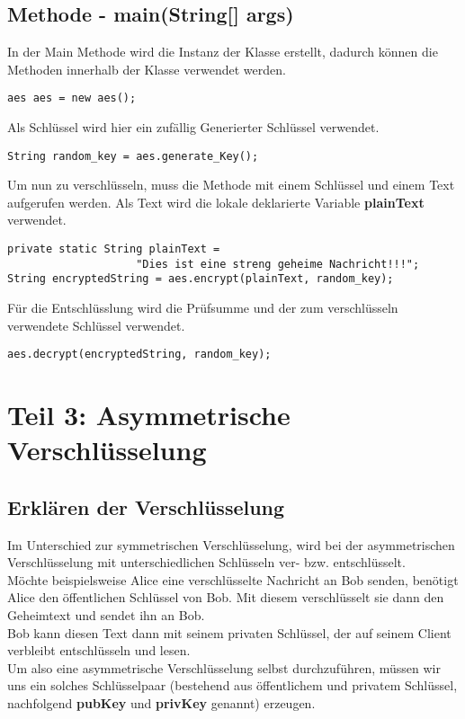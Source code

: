\documentclass[12pt]{article}
\begin{document}
\subsection{Methode - main(String[] args)}
In der Main Methode wird die Instanz der Klasse erstellt, dadurch können die Methoden innerhalb der Klasse verwendet werden.
\begin{lstlisting}
aes aes = new aes();
\end{lstlisting}
Als Schlüssel wird hier ein zufällig Generierter Schlüssel verwendet.
\begin{lstlisting}
String random_key = aes.generate_Key();
\end{lstlisting}
Um nun zu verschlüsseln, muss die Methode mit einem Schlüssel und einem Text aufgerufen werden. Als Text wird die lokale deklarierte Variable \textbf{plainText} verwendet. 
\begin{lstlisting}
private static String plainText = 
                    "Dies ist eine streng geheime Nachricht!!!";
String encryptedString = aes.encrypt(plainText, random_key);
\end{lstlisting}
Für die Entschlüsslung wird die Prüfsumme und der zum verschlüsseln verwendete Schlüssel verwendet.
\begin{lstlisting}
aes.decrypt(encryptedString, random_key);
\end{lstlisting}
\newpage

\section{Teil 3: Asymmetrische Verschlüsselung}
\subsection{Erklären der Verschlüsselung}

Im Unterschied zur symmetrischen Verschlüsselung, wird bei der asymmetrischen Verschlüsselung mit unterschiedlichen Schlüsseln ver- bzw. entschlüsselt. \\
Möchte beispielsweise Alice eine verschlüsselte Nachricht an Bob senden, benötigt Alice den öffentlichen Schlüssel von Bob. Mit diesem verschlüsselt sie dann den Geheimtext und sendet ihn an Bob.\\
Bob kann diesen Text dann mit seinem privaten Schlüssel, der auf seinem Client verbleibt entschlüsseln und lesen. \\
Um also eine asymmetrische Verschlüsselung selbst durchzuführen, müssen wir uns ein solches Schlüsselpaar (bestehend aus öffentlichem und privatem Schlüssel, nachfolgend \textbf{pubKey} und \textbf{privKey} genannt) erzeugen.
\end{document}
